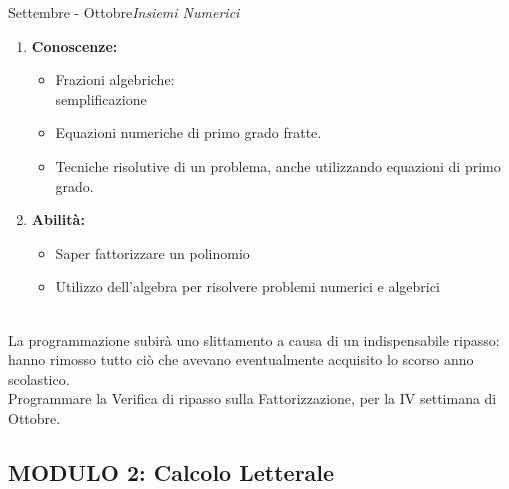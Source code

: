 \documentclass[10pt, a4paper twoside, notitlepage, notoc, justified]{tufte-handout}
\begin{document}
\begin{loggentry}{Settembre - Ottobre}{\em Insiemi Numerici}
\begin{multicols}{2}
{\begin{enumerate}
		\item {\bf Conoscenze:}
		\begin{itemize}
			\item Frazioni algebriche:\\ semplificazione
			\item Equazioni numeriche di primo grado fratte.
			\item Tecniche risolutive di un problema, anche utilizzando equazioni di primo grado.
			\end{itemize}
		\item {\bf Abilità:}
		\begin{itemize}
			\item Saper fattorizzare un polinomio
			\item Utilizzo dell'algebra per risolvere problemi numerici e algebrici
			\end{itemize}
	\end{enumerate} 
}
\end{multicols}
\\ La programmazione subirà uno slittamento a causa di un indispensabile ripasso: hanno rimosso tutto ciò che avevano eventualmente acquisito lo scorso anno scolastico. 
\\ Programmare la Verifica di ripasso sulla Fattorizzazione, per la IV settimana di Ottobre.
\end{loggentry}

\newpage
\subsection{\small \bf MODULO 2: Calcolo Letterale}
\end{document}
